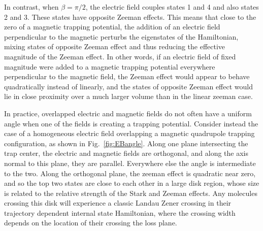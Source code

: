 \documentclass[%
 reprint,
 amsmath,amssymb,
 aps,
prl,
]{revtex4-1}
\begin{document}
In contrast, when $\beta=\pi/2$, the electric field couples states 1 and 4 and also states 2 and 3. These states have opposite Zeeman effects. This means that close to the zero of a magnetic trapping potential, the addition of an electric field perpendicular to the magnetic perturbs the eigenstates of the Hamiltonian, mixing states of opposite Zeeman effect and thus reducing the effective magnitude of the Zeeman effect. In other words, if an electric field of fixed magnitude were added to a magnetic trapping potential everywhere perpendicular to the magnetic field, the Zeeman effect would appear to behave quadratically instead of linearly, and the states of opposite Zeeman effect would lie in close proximity over a much larger volume than in the linear zeeman case.

In practice, overlapped electric and magnetic fields do not often have a uniform angle when one of the fields is creating a trapping potential. Consider instead the case of a homogeneous electric field overlapping a magnetic quadrupole trapping configuration, as shown in Fig.~\ref{fig:EBangle}. Along one plane intersecting the trap center, the electric and magnetic fields are orthogonal, and along the axis normal to this plane, they are parallel. Everywhere else the angle is intermediate to the two. Along the orthogonal plane, the zeeman effect is quadratic near zero, and so the top two states are close to each other in a large disk region, whose size is related to the relative strength of the Stark and Zeeman effects. Any molecules crossing this disk will experience a classic Landau Zener crossing in their trajectory dependent internal state Hamiltonian, where the crossing width depends on the location of their crossing the loss plane.                                                                                                                                                                                                                                                                                                                                                                                                                                                                                                                                                                                                                                                                                                                                                                                                                                                                                                                                                                                                                                                                                                                                                                                                                                                                                                                                                                                                                                                                                                                                                                                                         
\end{document}
